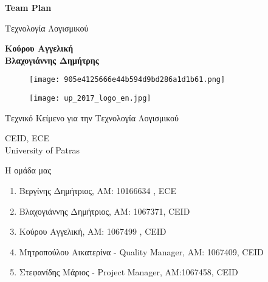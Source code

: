 \documentclass{article}
\begin{document}
\begin{titlepage}
   \begin{center}
       \vspace*{1cm}

       \textbf{\huge Team Plan}

       \vspace{0.5cm}
        Τεχνολογία Λογισμικού
            
       \vspace{1cm}

       \textbf{Κούρου Αγγελική\\Βλαχογιάννης Δημήτρης}
       
       \begin{figure}[!htb]
        \centering
        \texttt{[image: 905e4125666e44b594d9bd286a1d1b61.png]}
        \end{figure}
        
        \vspace{0.5cm}
        
        \begin{figure}[!htb]
        \centering
        \texttt{[image: up\_2017\_logo\_en.jpg]}
        \end{figure}


       \vfill
            
       Τεχνικό Κείμενο για την Τεχνολογία Λογισμικού\\
            
       \vspace{0.5cm}
            
        CEID, ECE \\
       University of Patras\\
            
   \end{center}
\end{titlepage}



\noindent Η ομάδα μας

\begin{enumerate}
  \item Βεργίνης Δημήτριος, ΑΜ: 10166634 , ECE
  \item Βλαχογιάννης Δημήτριος, ΑΜ: 1067371, CEID
  \item Κούρου Αγγελική, ΑΜ: 1067499 , CEID
  \item Μητροπούλου Αικατερίνα - Quality Manager, ΑΜ: 1067409, CEID
  \item Στεφανίδης Μάριος - Project Manager, ΑΜ:1067458, CEID
\end{enumerate}
\end{document}
